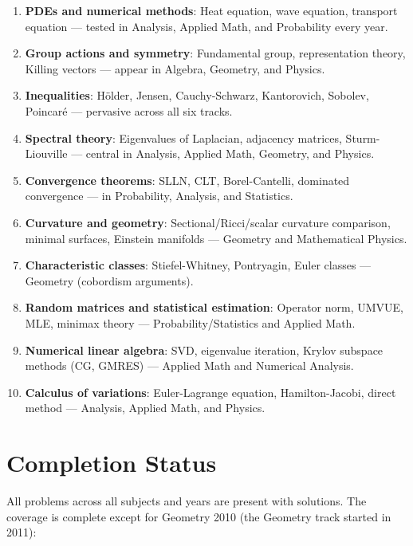 \begin{enumerate}
    \item \textbf{PDEs and numerical methods}: Heat equation, wave equation, transport equation --- tested in Analysis, Applied Math, and Probability every year.
    \item \textbf{Group actions and symmetry}: Fundamental group, representation theory, Killing vectors --- appear in Algebra, Geometry, and Physics.
    \item \textbf{Inequalities}: H\"older, Jensen, Cauchy-Schwarz, Kantorovich, Sobolev, Poincar\'e --- pervasive across all six tracks.
    \item \textbf{Spectral theory}: Eigenvalues of Laplacian, adjacency matrices, Sturm-Liouville --- central in Analysis, Applied Math, Geometry, and Physics.
    \item \textbf{Convergence theorems}: SLLN, CLT, Borel-Cantelli, dominated convergence --- in Probability, Analysis, and Statistics.
    \item \textbf{Curvature and geometry}: Sectional/Ricci/scalar curvature comparison, minimal surfaces, Einstein manifolds --- Geometry and Mathematical Physics.
    \item \textbf{Characteristic classes}: Stiefel-Whitney, Pontryagin, Euler classes --- Geometry (cobordism arguments).
    \item \textbf{Random matrices and statistical estimation}: Operator norm, UMVUE, MLE, minimax theory --- Probability/Statistics and Applied Math.
    \item \textbf{Numerical linear algebra}: SVD, eigenvalue iteration, Krylov subspace methods (CG, GMRES) --- Applied Math and Numerical Analysis.
    \item \textbf{Calculus of variations}: Euler-Lagrange equation, Hamilton-Jacobi, direct method --- Analysis, Applied Math, and Physics.
\end{enumerate}

\section{Completion Status}
\label{sec:coverage}

All problems across all subjects and years are present with solutions. The coverage is complete except for Geometry 2010 (the Geometry track started in 2011):

